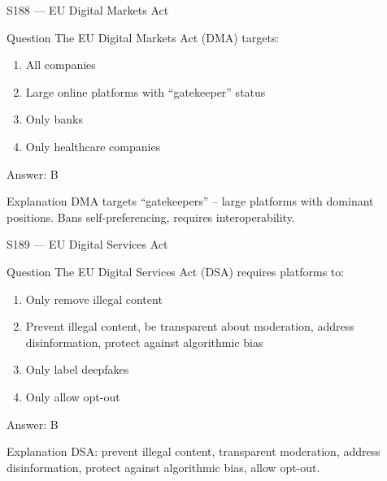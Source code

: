 \documentclass[aspectratio=169,8pt]{beamer}
\begin{document}
\begin{frame}{S188 --- EU Digital Markets Act}
	\begin{block}{Question}
		The EU Digital Markets Act (DMA) targets:
		\begin{enumerate}
			\item All companies
			\item Large online platforms with ``gatekeeper'' status
			\item Only banks
			\item Only healthcare companies
		\end{enumerate}
	\end{block}
	\begin{exampleblock}{Answer: B}\end{exampleblock}
	\begin{block}{Explanation}
		DMA targets ``gatekeepers'' -- large platforms with dominant positions. Bans self-preferencing, requires interoperability.
	\end{block}
\end{frame}

\begin{frame}{S189 --- EU Digital Services Act}
	\begin{block}{Question}
		The EU Digital Services Act (DSA) requires platforms to:
		\begin{enumerate}
			\item Only remove illegal content
			\item Prevent illegal content, be transparent about moderation, address disinformation, protect against algorithmic bias
			\item Only label deepfakes
			\item Only allow opt-out
		\end{enumerate}
	\end{block}
	\begin{exampleblock}{Answer: B}\end{exampleblock}
	\begin{block}{Explanation}
		DSA: prevent illegal content, transparent moderation, address disinformation, protect against algorithmic bias, allow opt-out.
	\end{block}
\end{frame}
\end{document}
